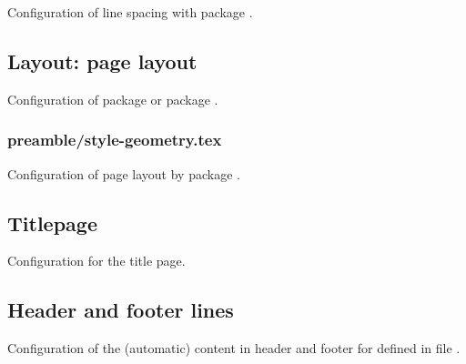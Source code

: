 Configuration of line spacing with package .


\subsection{Layout: page layout}
\label{sec:style:layout:page}

Configuration of package  or package .


\subsubsection{preamble/style-geometry.tex}

Configuration of page layout by package . 




\subsection{Titlepage}
\label{sec:style:titlepage}
Configuration for the title page.


\subsection{Header and footer lines}
\label{sec:style:headfoot}

Configuration of the (automatic) content in header and footer for  defined in file .


